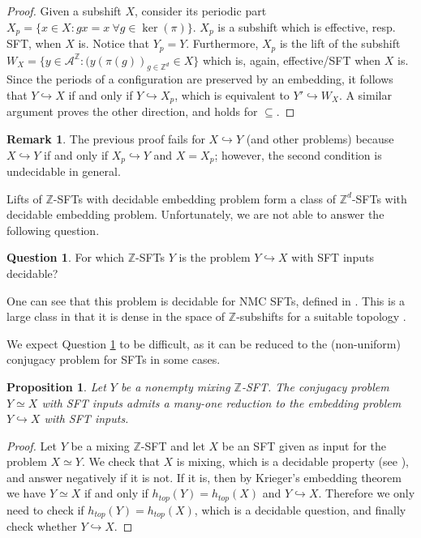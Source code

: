 \documentclass[a4paper]{article}
\newcommand{\Z}{\mathbb{Z}}
\newcommand{\A}{\mathcal{A}}
\newtheorem{proposition}[theorem]{Proposition}
\theoremstyle{definition}
\newtheorem{remark}[theorem]{Remark}
\newtheorem{question}[theorem]{Question}
\begin{document}
\begin{proof}
Given a subshift $X$, consider its periodic part $X_p = \{x\in X : gx=x \ \forall g\in \ker(\pi)\}$. $X_p$ is a subshift which is effective, resp. SFT, when $X$ is. Notice that $Y_p=Y$. Furthermore, $X_p$ is the lift of the subshift $W_X=\{y\in \A^{\Z} : (y(\pi(g))_{g\in\mathbb{Z}^d}\in X\}$
which is, again, effective/SFT when $X$ is.
Since the periods of a configuration are preserved by an embedding, it follows that $Y\hookrightarrow X$ if and only if $Y \hookrightarrow X_p$, which is equivalent to $Y'\hookrightarrow W_X$. A similar argument proves the other direction, and holds for $\subseteq$.
\end{proof}

\begin{remark}
    The previous proof fails for $X \hookrightarrow Y$ (and other problems) because $X\hookrightarrow Y$ if and only if $X_p \hookrightarrow Y$ and $X = X_p$; however, the second condition is undecidable in general.
\end{remark}

Lifts of $\Z$-SFTs with decidable embedding problem form a class of $\Z^d$-SFTs with decidable embedding problem. Unfortunately, we are not able to answer the following question.
\begin{question}\label{question:decidability-embedding-Z-SFTs}
    For which $\mathbb{Z}$-SFTs $Y$ is the problem $Y\hookrightarrow X$ with SFT inputs decidable?
\end{question}

One can see that this problem is decidable for NMC SFTs, defined in \cite{pavlov_structure_2023}. This is a large class in that it is dense in the space of $\Z$-subshifts for a suitable topology \cite[Theorem~3.6]{pavlov_structure_2023}.

We expect Question \ref{question:decidability-embedding-Z-SFTs} to be difficult, as it can be reduced to the (non-uniform) conjugacy problem for SFTs in some cases.
\begin{proposition}
\label{embedding-zsft}
Let $Y$ be a nonempty mixing $\Z$-SFT. The conjugacy problem $Y \simeq X$ with SFT inputs admits a many-one reduction to the embedding problem $Y \hookrightarrow X$ with SFT inputs. 
\end{proposition}

\begin{proof}
    Let $Y$ be a mixing $\Z$-SFT and let $X$ be an SFT given as input for the problem $X\simeq Y$. We check that $X$ is mixing, which is a decidable property (see \cite{lind_introduction_1995}), and answer negatively if it is not. If it is, then by Krieger's embedding theorem we have $Y\simeq X$ if and only if $h_{top}(Y)=h_{top}(X)$ and  $Y\hookrightarrow X$. Therefore we only need to check if $h_{top}(Y)=h_{top}(X)$, which is a decidable question, and finally check whether $Y\hookrightarrow X$. 
\end{proof}
\end{document}
